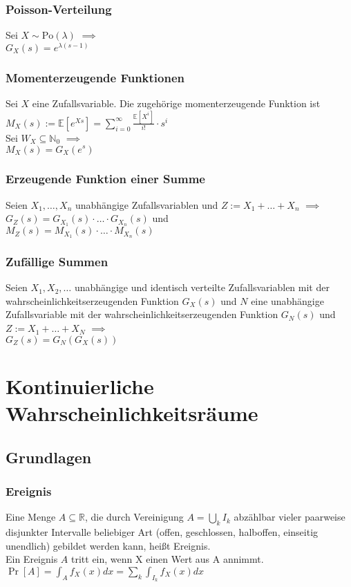 \documentclass[a4paper,9pt]{extarticle}
\begin{document}
\subsubsection*{Poisson-Verteilung}
Sei $X \sim \text{Po}(\lambda)$ $\implies$ \\
$G_X(s) = e^{\lambda(s - 1)}$

\subsubsection*{Momenterzeugende Funktionen}
Sei $X$ eine Zufallsvariable. Die zugehörige momenterzeugende Funktion ist \\
$M_X(s) := \mathbb{E}[e^{Xs}] = \sum_{i=0}^∞ \frac{\mathbb{E}[X^i]}{i!} ⋅ s^i$ \\

Sei $W_X \subseteq \mathbb{N}_0$ $\implies$ \\
$M_X(s) = G_X(e^s)$

\subsubsection*{Erzeugende Funktion einer Summe}
Seien $X_1, \dots, X_n$ unabhängige Zufallsvariablen und $Z := X_1 + \dots + X_n$ $\implies$ \\
$G_Z(s) = G_{X_1}(s) ⋅ \dots ⋅ G_{X_n}(s)$ und\\
$M_Z(s) = M_{X_1}(s) ⋅ \dots ⋅ M_{X_n}(s)$

\subsubsection*{Zufällige Summen}
Seien $X_1, X_2, \dots$ unabhängige und identisch verteilte Zufallsvariablen mit der wahrscheinlichkeitserzeugenden Funktion $G_X(s)$ und $N$ eine unabhängige Zufallsvariable mit der wahrscheinlichkeitserzeugenden Funktion $G_N(s)$ und $Z := X_1 + \dots + X_N$ $\implies$ \\
$G_Z(s) = G_N(G_X(s))$

\newpage

\section*{Kontinuierliche Wahrscheinlichkeitsräume}
\subsection*{Grundlagen}
\subsubsection*{Ereignis}
Eine Menge $A \subseteq \mathbb{R}$, die durch Vereinigung $A = \bigcup_k I_k$ abzählbar vieler paarweise disjunkter Intervalle beliebiger Art (offen, geschlossen, halboffen, einseitig unendlich) gebildet werden kann, heißt Ereignis. \\
Ein Ereignis $A$ tritt ein, wenn X einen Wert aus A annimmt. \\
$\Pr[A] = \int_A f_X(x) dx = \sum_k \int_{I_k} f_X(x) dx$
\end{document}
